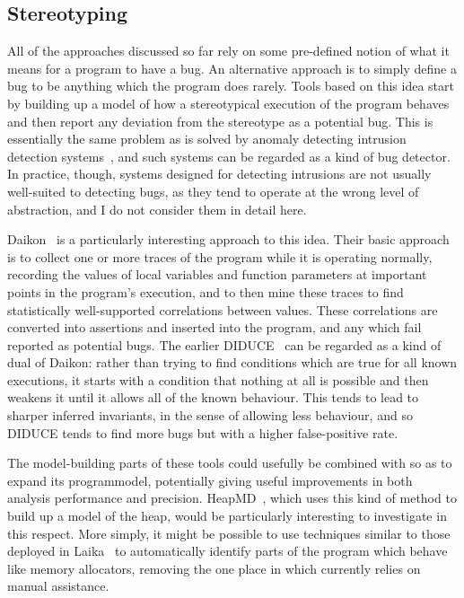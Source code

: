 \subsection{Stereotyping}
\label{sect:rw:stereotyping}

All of the approaches discussed so far rely on some pre-defined notion
of what it means for a program to have a bug.  An alternative approach
is to simply define a bug to be anything which the program does
rarely.  Tools based on this idea start by building up a model of how
a stereotypical execution of the program behaves and then report any
deviation from the stereotype as a potential bug.  This is essentially
the same problem as is solved by anomaly detecting intrusion detection
systems~\cite{Forrest1996a}, and such systems can be regarded as a kind
of bug detector.  In practice, though, systems designed for detecting
intrusions are not usually well-suited to detecting bugs, as they tend
to operate at the wrong level of abstraction, and I do not consider
them in detail here.

Daikon~\cite{Ernst2007} is a particularly interesting approach to this
idea.  Their basic approach is to collect one or more traces of the
program while it is operating normally, recording the values of local
variables and function parameters at important points in the program's
execution, and to then mine these traces to find statistically
well-supported correlations between values.  These correlations are
converted into assertions and inserted into the program, and any which
fail reported as potential bugs.  The earlier DIDUCE~\cite{Hangal2002}
can be regarded as a kind of dual of Daikon: rather than trying to
find conditions which are true for all known executions, it starts
with a condition that nothing at all is possible and then weakens it
until it allows all of the known behaviour.  This tends to lead to
sharper inferred invariants, in the sense of allowing less behaviour,
and so DIDUCE tends to find more bugs but with a higher false-positive
rate.

The model-building parts of these tools could usefully be combined
with {\technique} so as to expand its \gls{programmodel}, potentially
giving useful improvements in both analysis performance and precision.
HeapMD~\cite{Chilimbi2006}, which uses this kind of method to build up
a model of the heap, would be particularly interesting to investigate
in this respect.  More simply, it might be possible to use techniques
similar to those deployed in Laika~\cite{Cozzie2008} to automatically
identify parts of the program which behave like memory allocators,
removing the one place in which {\technique} currently relies on
manual assistance.

